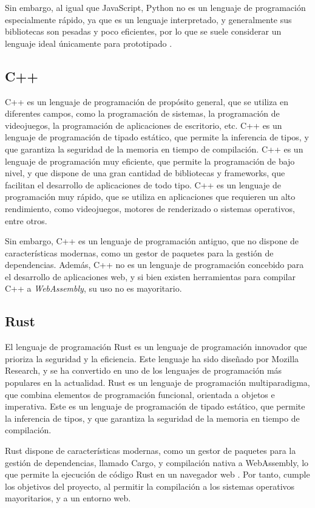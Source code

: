 Sin embargo, al igual que JavaScript, Python no es un lenguaje de programación especialmente rápido, ya que es un lenguaje interpretado, y generalmente sus bibliotecas son pesadas y poco eficientes, por lo que se suele considerar un lenguaje ideal únicamente para prototipado \autocite{SlowestProgrammingLanguages2020}.

\subsection{C++}
C++ es un lenguaje de programación de propósito general, que se utiliza en diferentes campos, como la programación de sistemas, la programación de videojuegos, la programación de aplicaciones de escritorio, etc. C++ es un lenguaje de programación de tipado estático, que permite la inferencia de tipos, y que garantiza la seguridad de la memoria en tiempo de compilación. C++ es un lenguaje de programación muy eficiente, que permite la programación de bajo nivel, y que dispone de una gran cantidad de bibliotecas y frameworks, que facilitan el desarrollo de aplicaciones de todo tipo. C++ es un lenguaje de programación muy rápido, que se utiliza en aplicaciones que requieren un alto rendimiento, como videojuegos, motores de renderizado o sistemas operativos, entre otros. 

Sin embargo, C++ es un lenguaje de programación antiguo, que no dispone de características modernas, como un gestor de paquetes para la gestión de dependencias. Además, C++ no es un lenguaje de programación concebido para el desarrollo de aplicaciones web, y si bien existen herramientas para compilar C++ a \textit{WebAssembly}, su uso no es mayoritario.

\subsection{Rust}
El lenguaje de programación Rust es un lenguaje de programación innovador que prioriza la seguridad y la eficiencia. Este lenguaje ha sido diseñado por Mozilla Research, y se ha convertido en uno de los lenguajes de programación más populares en la actualidad. Rust es un lenguaje de programación multiparadigma, que combina elementos de programación funcional, orientada a objetos e imperativa. Este es un lenguaje de programación de tipado estático, que permite la inferencia de tipos, y que garantiza la seguridad de la memoria en tiempo de compilación.

Rust dispone de características modernas, como un gestor de paquetes para la gestión de dependencias, llamado Cargo, y compilación nativa a WebAssembly, lo que permite la ejecución de código Rust en un navegador web \autocite{WebAssembly}. Por tanto, cumple los objetivos del proyecto, al permitir la compilación a los sistemas operativos mayoritarios, y a un entorno web.

